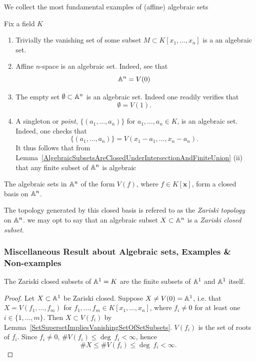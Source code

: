 We collect the most fundamental examples of (affine) algebraic sets
\begin{example}\label{FundamentalExmaplesOfAffineAlgebraicSubsets}
Fix a field $K$
    \begin{enumerate}
        \item Trivially the vanishing set of some subset $M\subset K[x_1,\dots,x_n]$ is a an algebraic set. 
        \item Affine $n$-space is an algebraic set. Indeed, see that 
        $$\mathbb{A}^n = V(0)$$
        \item The empty set $\emptyset\subset \mathbb{A}^n$ is an algebraic set. Indeed one readily verifies that
        $$\emptyset = V(1).$$
        \item A singleton or \textit{point}, $\{(a_1,\dots,a_n)\}$ for $a_1,\dots,a_n\in K$, is an algebraic set. Indeed, one checks that
        $$\{(a_1,\dots,a_n)\} = V(x_1-a_1,\dots,x_n-a_n).$$
        It thus follows that from Lemma~\ref{AlgebraicSubsetsAreClosedUnderIntersectionAndFiniteUnion} (ii) that any finite subset of $\mathbb{A}^n$ is algebraic
    \end{enumerate}
\end{example}
\begin{corollary}
    The algebraic sets in $\mathbb{A}^n$ of the form $V(f)$, where $f\in K[\mathbf{x}]$, form a closed basis on $\mathbb{A}^n$.
\end{corollary}
\begin{remark}
    The topology generated by this closed basis is refered to as the \emph{Zariski topology} on $\mathbb{A}^n$. we may opt to say that an algebraic subset $X\subset \mathbb{A}^n$ is a \textit{Zariski closed subset}. 
\end{remark}
\subsubsection{Miscellaneous Result about Algebraic sets, Examples \& Non-examples}
\begin{proposition}\label{AlgebraicSubsetsOfAffine1SpaceAreFiniteSetsAndTheWholeSpace}
    The Zariski closed subsets of $\mathbb{A}^1=K$ are the finite subsets of $\mathbb{A}^1$ and $\mathbb{A}^1$ itself.  
\end{proposition}
\begin{proof}
    Let $X\subset \mathbb{A}^1$ be Zariski closed. Suppose $X\neq V(0)=\mathbb{A}^1$, i.e. that $X = V(f_1,\dots,f_m)$ for $f_1,\dots,f_m\in K[x_1,\dots,x_n]$, where $f_i \neq 0$ for at least one $i\in\{1,\dots,m\}$.  Then $X\subset V(f_i)$ by Lemma~\ref{SetSupersetImpliesVanishingSetOfSetSubsets}.  $V(f_i)$ is the set of roots of $f_i$. Since $f_i\neq 0$, $\# V(f_i) \leq \deg \ f_i < \infty$, hence 
    $$\#X\leq \#V(f_i)\leq \deg \ f_i<\infty.$$
\end{proof}


